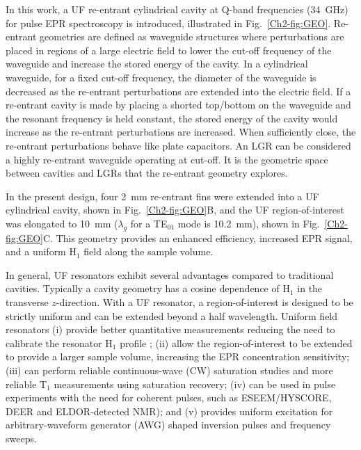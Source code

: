 In this work, a UF re-entrant cylindrical \cylTE{} cavity at Q-band frequencies (34~GHz) for pulse EPR spectroscopy is introduced, illustrated in Fig.~\ref{Ch2-fig:GEO}. Re-entrant geometries are defined as waveguide structures where perturbations are placed in regions of a large electric field to lower the cut-off frequency of the waveguide and increase the stored energy of the cavity. \cite{ramo1984fields, MITRadWaveguide} In a cylindrical waveguide, for a fixed cut-off frequency, the diameter of the waveguide is decreased as the re-entrant perturbations are extended into the electric field. If a re-entrant cavity is made by placing a shorted top/bottom on the waveguide and the resonant frequency is held constant, the stored energy of the cavity would increase as the re-entrant perturbations are increased. When sufficiently close, the re-entrant perturbations behave like plate capacitors. An LGR can be considered a highly re-entrant waveguide operating at cut-off. It is the geometric space between cavities and LGRs that the re-entrant geometry explores. 

In the present design, four 2~mm re-entrant fins were extended into a UF cylindrical \cylTE{} cavity, shown in Fig.~\ref{Ch2-fig:GEO}B, and the UF region-of-interest was elongated to 10~mm ($\lambda_g$ for a TE$_{01}$ mode is 10.2~mm), shown in Fig.~\ref{Ch2-fig:GEO}C. This geometry provides an enhanced efficiency, increased EPR signal, and a uniform H$_1$ field along the sample volume.

In general, UF resonators exhibit several advantages compared to traditional cavities. Typically a cavity geometry has a cosine dependence of H$_1$ in the transverse $z$-direction. With a UF resonator, a region-of-interest is designed to be strictly uniform and can be extended beyond a half wavelength. Uniform field resonators (i) provide better quantitative measurements reducing the need to calibrate the resonator H$_1$ profile \cite{eaton2010quantitative}; (ii) allow the region-of-interest to be extended to provide a larger sample volume, increasing the EPR concentration sensitivity; (iii) can perform reliable continuous-wave (CW) saturation studies \cite{klugsdsl} and more reliable T$_1$ measurements using saturation recovery;  (iv) can be used in pulse experiments with the need for coherent pulses, such as ESEEM/HYSCORE, DEER\cite{pulsejeschke} and ELDOR-detected NMR\cite{COX201763}); and (v) provides uniform excitation for arbitrary-waveform generator (AWG) shaped inversion pulses \cite{stollshaped, shapedpulse} and frequency sweeps. \cite{DOLL201746}

